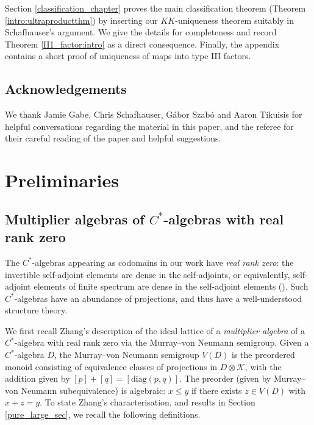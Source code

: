 \documentclass[reqno]{amsart}
\theoremstyle{definition}
\theoremstyle{remark}
\numberwithin{equation}{section}
\theoremstyle{definition}
\newcommand{\calK}{\mathcal{K}}
\begin{document}
Section \ref{classification_chapter} proves the main classification theorem (Theorem \ref{intro:ultraproductthm}) by inserting our $KK$-uniqueness theorem suitably in Schafhauser's argument.  We give the details for completeness and record Theorem \ref{II1_factor:intro} as a direct consequence. Finally, the appendix contains a short proof of uniqueness of maps into type III factors. 

\subsection*{Acknowledgements} We thank Jamie Gabe, Chris Schafhauser, Gábor Szabó and Aaron Tikuisis for helpful conversations regarding the material in this paper, and the referee for their careful reading of the paper and helpful suggestions. 

\section{Preliminaries} 
\subsection{Multiplier algebras of $C^*$-algebras with real rank zero}
\label{Multi_rr0_sec}
The $C^*$-algebras appearing as codomains in our work have \emph{real rank zero}: the invertible self-adjoint elements are dense in the self-adjoints, or equivalently, self-adjoint elements of finite spectrum are dense in the self-adjoint elements (\cite[Theorem 2.6]{BrownPedersen:JFA}). Such $C^*$-algebras have an abundance of projections, and thus have a well-understood structure theory. 

We first recall Zhang's description of the ideal lattice of a \emph{multiplier algebra} of a $C^*$-algebra with real rank zero via the Murray--von Neumann semigroup. Given a $C^*$-algebra $D$, the Murray--von Neumann semigroup $V(D)$ is the preordered monoid consisting of equivalence classes of projections in $D\otimes \calK$, with the addition given by $[p]+ [q] = [\mathrm{diag}(p, q)]$. The preorder (given by Murray--von Neumann subequivalence) is algebraic: $x\leq y$ if there exists $z\in V(D)$ with $x+z=y$. To state Zhang's characterisation, and results in Section \ref{pure_large_sec}, we recall the following definitions. 
\end{document}
